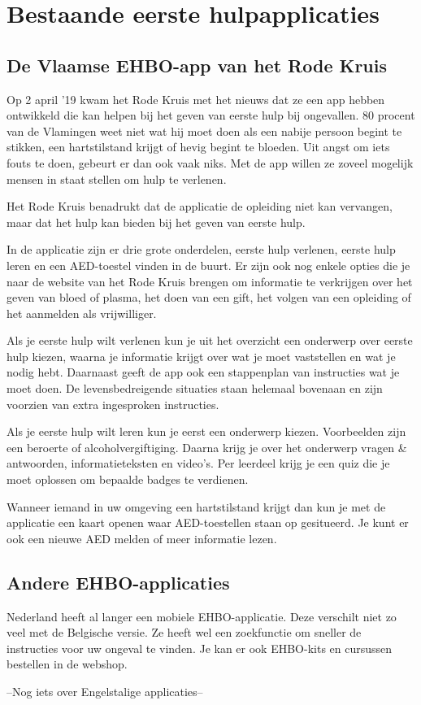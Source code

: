 \section{Bestaande eerste hulpapplicaties}
\subsection{De Vlaamse EHBO-app van het Rode Kruis}
Op 2 april ’19 kwam het Rode Kruis met het nieuws dat ze een app hebben ontwikkeld die kan helpen bij het geven van eerste hulp bij ongevallen. 80 procent van de Vlamingen weet niet wat hij moet doen als een nabije persoon begint te stikken, een hartstilstand krijgt of hevig begint te bloeden. Uit angst om iets fouts te doen, gebeurt er dan ook vaak niks. Met de app willen ze zoveel mogelijk mensen in staat stellen om hulp te verlenen. \autocite{Decroubele2019}

Het Rode Kruis benadrukt dat de applicatie de opleiding niet kan vervangen, maar dat het hulp kan bieden bij het geven van eerste hulp.

In de applicatie zijn er drie grote onderdelen, eerste hulp verlenen, eerste hulp leren en een AED-toestel vinden in de buurt. Er zijn ook nog enkele opties die je naar de website van het Rode Kruis brengen om informatie te verkrijgen over het geven van bloed of plasma, het doen van een gift, het volgen van een opleiding of het aanmelden als vrijwilliger.

Als je eerste hulp wilt verlenen kun je uit het overzicht een onderwerp over eerste hulp kiezen, waarna je informatie krijgt over wat je moet vaststellen en wat je nodig hebt. Daarnaast geeft de app ook een stappenplan van instructies wat je moet doen. De levensbedreigende situaties staan helemaal bovenaan en zijn voorzien van extra ingesproken instructies.

Als je eerste hulp wilt leren kun je eerst een onderwerp kiezen. Voorbeelden zijn een beroerte of alcoholvergiftiging. Daarna krijg je over het onderwerp vragen \& antwoorden, informatieteksten en video's. Per leerdeel krijg je een quiz die je moet oplossen om bepaalde badges te verdienen.

Wanneer iemand in uw omgeving een hartstilstand krijgt dan kun je met de applicatie een kaart openen waar AED-toestellen staan op gesitueerd. Je kunt er ook een nieuwe AED melden of meer informatie lezen.


\subsection{Andere EHBO-applicaties}
Nederland heeft al langer een mobiele EHBO-applicatie. Deze verschilt niet zo veel met de Belgische versie. Ze heeft wel een zoekfunctie om sneller de instructies voor uw ongeval te vinden. Je kan er ook EHBO-kits en cursussen bestellen in de webshop.

--Nog iets over Engelstalige applicaties--
